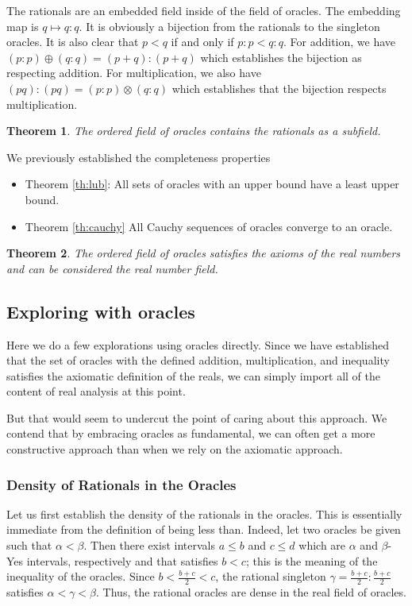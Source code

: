 \documentclass[12pt]{article}
\newtheorem{theorem}{Theorem}
\theoremstyle{remark}
\begin{document}
The rationals are an embedded field inside of the field of oracles. The embedding map is $q \mapsto q:q$. It is obviously a bijection from the rationals to the singleton oracles. It is also clear that $p<q$ if and only if $p:p < q:q$. For addition, we have $(p:p) \oplus (q:q) = (p+q):(p+q)$ which establishes the bijection as respecting addition. For multiplication, we also have $(pq):(pq) = (p:p) \otimes (q:q)$ which establishes that the bijection respects multiplication. 

\begin{theorem}
The ordered field of oracles contains the rationals as a subfield. 
\end{theorem}

We previously established the completeness properties

\begin{itemize}
    \item  Theorem \ref{th:lub}: All sets of oracles with an upper bound have a least upper bound. 
    \item Theorem \ref{th:cauchy} All Cauchy sequences of oracles converge to an oracle. 
\end{itemize}

\begin{theorem}
The ordered field of oracles satisfies the axioms of the real numbers and can be considered the real number field. 
\end{theorem}

\subsection{Exploring with oracles}

Here we do a few explorations using oracles directly. Since we have established that the set of oracles with the defined addition, multiplication, and inequality satisfies the axiomatic definition of the reals, we can simply import all of the content of real analysis at this point. 

But that would seem to undercut the point of caring about this approach. We contend that by embracing oracles as fundamental, we can often get a more constructive approach than when we rely on the axiomatic approach. 

\subsubsection{Density of Rationals in the Oracles}

Let us first establish the density of the rationals in the oracles. This is essentially immediate from the definition of being less than. Indeed, let two oracles be given such that $\alpha < \beta$. Then there exist intervals $a\leq b$ and $c\leq d$ which are $\alpha$ and $\beta$-Yes intervals, respectively and that satisfies $b < c$; this is the meaning of the inequality of the oracles. Since $b < \frac{b+c}{2} < c$, the rational singleton $\gamma = \frac{b+c}{2}:\frac{b+c}{2}$ satisfies $\alpha < \gamma < \beta$. Thus, the rational oracles are dense in the real field of oracles. 
\end{document}
